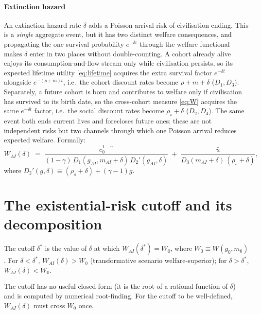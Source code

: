 \documentclass{_latex/house}
\begin{document}
\paragraph{Extinction hazard} An extinction-hazard rate $\delta$ adds a Poisson-arrival risk of civilisation ending. This is a \emph{single} aggregate event, but it has two distinct welfare consequences, and propagating the one survival probability $e^{-\delta t}$ through the welfare functional makes $\delta$ enter in two places without double-counting. A cohort already alive enjoys its consumption-and-flow stream only while civilisation persists, so its expected lifetime utility \eqref{eq:lifetime} acquires the extra survival factor $e^{-\delta t}$ alongside $e^{-(\rho+m)t}$, i.e.\ the cohort discount rates become $\rho+m+\delta$ ($D_1, D_3$). Separately, a future cohort is born and contributes to welfare only if civilisation has survived to its birth date, so the cross-cohort measure \eqref{eq:W} acquires the same $e^{-\delta t}$ factor, i.e.\ the social discount rates become $\rho_s+\delta$ ($D_2, D_4$). The same event both ends current lives and forecloses future ones; these are not independent risks but two channels through which one Poisson arrival reduces expected welfare. Formally:
\begin{equation}
W_{AI}(\delta) \;=\; \frac{c_0^{1-\gamma}}{(1-\gamma)\, D_1(g_{AI}, m_{AI}+\delta)\, D_2'(g_{AI}, \delta)} \;+\; \frac{\bar u}{D_3(m_{AI}+\delta)\, (\rho_s+\delta)},
\label{eq:W-AI}
\end{equation}
where $D_2'(g, \delta) \equiv (\rho_s + \delta) + (\gamma-1)g$.

\section{The existential-risk cutoff and its decomposition}
\label{sec:cutoff}

\begin{definition}
\label{def:cutoff}
The cutoff $\delta^*$ is the value of $\delta$ at which $W_{AI}(\delta^*) = W_0$, where $W_0 \equiv W(g_0, m_0)$. For $\delta < \delta^*$, $W_{AI}(\delta) > W_0$ (transformative scenario welfare-superior); for $\delta > \delta^*$, $W_{AI}(\delta) < W_0$.
\end{definition}

The cutoff has no useful closed form (it is the root of a rational function of $\delta$) and is computed by numerical root-finding. For the cutoff to be well-defined, $W_{AI}(\delta)$ must cross $W_0$ once.
\end{document}
